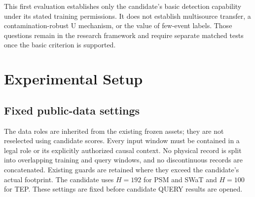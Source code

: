 \documentclass[
  english,
]{article}
\begin{document}
This first evaluation establishes only the candidate's basic detection
capability under its stated training permissions. It does not establish
multisource transfer, a contamination-robust U mechanism, or the value
of few-event labels. Those questions remain in the research framework
and require separate matched tests once the basic criterion is
supported.

\section{Experimental Setup}\label{experimental-setup}

\subsection{Fixed public-data
settings}\label{fixed-public-data-settings}

The data roles are inherited from the existing frozen assets; they are
not reselected using candidate scores. Every input window must be
contained in a legal role or its explicitly authorized causal context.
No physical record is split into overlapping training and query windows,
and no discontinuous records are concatenated. Existing guards are
retained where they exceed the candidate's actual footprint. The
candidate uses \(H=192\) for PSM and SWaT and \(H=100\) for TEP. These
settings are fixed before candidate QUERY results are opened.
\end{document}
